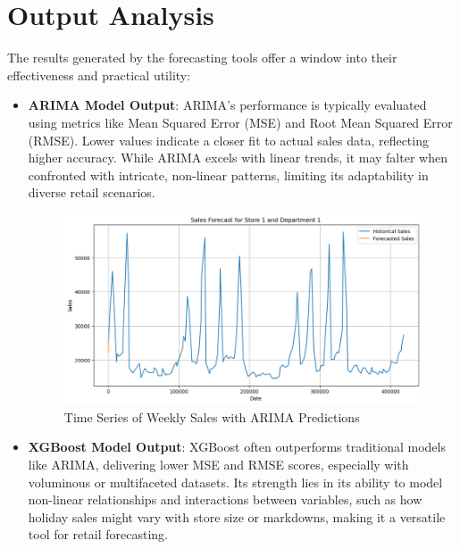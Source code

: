\section{Output Analysis}
The results generated by the forecasting tools offer a window into their effectiveness and practical utility:
\begin{itemize}
    \item \textbf{ARIMA Model Output}: ARIMA’s performance is typically evaluated using metrics like Mean Squared Error (MSE) and Root Mean Squared Error (RMSE). Lower values indicate a closer fit to actual sales data, reflecting higher accuracy. While ARIMA excels with linear trends, it may falter when confronted with intricate, non-linear patterns, limiting its adaptability in diverse retail scenarios.
    \begin{figure}[h]
        \centering
        \includegraphics[width=0.8\linewidth]{latex/figures_adarsh/Sales_forecasting.png}
        \caption{Time Series of Weekly Sales with ARIMA Predictions}
        \label{fig:sales_over_time}
    \end{figure}
    
    \item \textbf{XGBoost Model Output}: XGBoost often outperforms traditional models like ARIMA, delivering lower MSE and RMSE scores, especially with voluminous or multifaceted datasets. Its strength lies in its ability to model non-linear relationships and interactions between variables, such as how holiday sales might vary with store size or markdowns, making it a versatile tool for retail forecasting.
    

\end{itemize}
